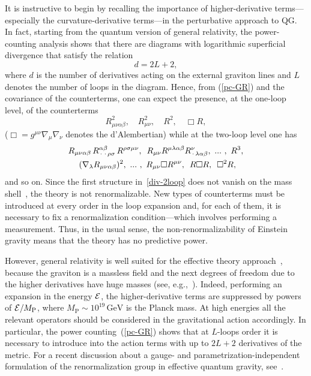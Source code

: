 \documentclass[aps,prd,a4paper,twocolumn,showpacs,showkeys,preprintnumbers,amsmath,amssymb,nofootinbib,usenames,dvipsnames]{revtex4-2}
\newcommand{\be}{\begin{eqnarray}}
\def\beq{\begin{equation}}
\def\eeq{\end{equation}}
\newcommand{\eq}[1]{(\ref{#1})}
\newcommand{\n}[1]{\label{#1}}
\def\al{\alpha}
\def\be{\beta}
\def\la{\lambda}
\def\si{\sigma}
\def\na{\nabla}
\begin{document}
It is instructive to begin by recalling the importance of higher-derivative terms---especially the curvature-derivative terms---in the perturbative approach to QG.
In fact, starting from the quantum version of general relativity, the power-counting analysis shows that there are diagrams with logarithmic superficial divergence
that satisfy the relation 
\beq
\n{pc-GR}
d = 2 L + 2,
\eeq  
where $d$ is the number of derivatives acting on the external graviton lines and $L$ denotes the number of loops in the diagram. Hence, from \eq{pc-GR} and the covariance of the counterterms, one can expect the presence, at the one-loop level, of the counterterms \cite{hove,dene,KTT}
\beq
\n{div-oneloop}
R_{\mu\nu\al\be}^2, 
\quad 
R_{\mu\nu}^2, 
\quad
R^2, 
\quad
\Box R
,
\eeq
($\Box = g^{\mu\nu} \na_\mu \na_\nu$ denotes the d'Alembertian) while at the two-loop level one has
\beq
\begin{split}
\n{div-2loop}
&
R_{\mu\nu\al\be}
\,R^{\al\be}_{\,\cdot\,\,\cdot\,\rho\si}
\,R^{\rho\si\mu\nu}, 
\,\,\,
R_{\mu\nu} R^{\mu\la\al\be} R^\nu_{\,\cdot\,\la\al\be}, 
\,\,
... \,\,,
\,\,
R^3,
\\
&
\hskip 0.45 cm
(\na_\la R_{\mu\nu\al\be})^2,
\,\,
... \,\,,
\,\,
R_{\mu\nu} \Box R^{\mu\nu},
\,\,\,
R \Box R,
\,\,\,
\Box^2 R,
\end{split}
\eeq 
and so on. Since the first structure in~\eqref{div-2loop} does not vanish on the mass shell~\cite{GorSag,vanVen}, the theory is not renormalizable. New types of counterterms must be introduced at every order in the loop expansion and, for each of them, it is necessary to fix a renormalization condition---which involves performing a measurement. Thus, in the usual sense, the non-renormalizability of Einstein gravity means that the theory has no predictive power.

However, general relativity is well suited for the effective theory approach~\cite{don}, because the graviton is a massless field and the next degrees of freedom due to the higher derivatives have huge masses (see, {e.g.},~\cite{Accioly:2016etf}). Indeed, performing an expansion in the energy ${\cal E}$, the higher-derivative terms are suppressed by powers of ${\cal E}/M_\text{P}$, where $M_\text{P} \sim 10^{19} \, \text{GeV}$ is the Planck mass. At high energies all the relevant operators should be considered in the gravitational action accordingly. In particular, the power counting~\eq{pc-GR} shows that at $L$-loops order it is necessary to introduce into the action terms with up to $2L + 2$ derivatives of the metric. For a recent discussion about a gauge- and parametrization-independent formulation of the renormalization group in effective quantum gravity, see~\cite{Giacchini:2020zrl}.
\end{document}
